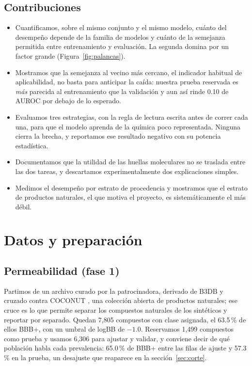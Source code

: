 \documentclass[twocolumn,10pt,letterpaper]{article}
\begin{document}
\subsection{Contribuciones}

\begin{itemize}\itemsep1pt
\item Cuantificamos, sobre el mismo conjunto y el mismo modelo, cuánto del desempeño depende de la familia de modelos y cuánto de la semejanza permitida entre entrenamiento y evaluación. La segunda domina por un factor grande (Figura~\ref{fig:palancas}).
\item Mostramos que la semejanza al vecino más cercano, el indicador habitual de aplicabilidad, no basta para anticipar la caída: nuestra prueba reservada es \emph{más} parecida al entrenamiento que la validación y aun así rinde 0.10 de AUROC por debajo de lo esperado.
\item Evaluamos tres estrategias, con la regla de lectura escrita antes de correr cada una, para que el modelo aprenda de la química poco representada. Ninguna cierra la brecha, y reportamos ese resultado negativo con su potencia estadística.
\item Documentamos que la utilidad de las huellas moleculares no se traslada entre las dos tareas, y descartamos experimentalmente dos explicaciones simples.
\item Medimos el desempeño por estrato de procedencia y mostramos que el estrato de productos naturales, el que motiva el proyecto, es sistemáticamente el más débil.
\end{itemize}

\section{Datos y preparación}

\subsection{Permeabilidad (fase 1)}

Partimos de un archivo curado por la patrocinadora, derivado de B3DB \autocite{meng2021b3db} y cruzado contra COCONUT \autocite{chandrasekhar2025coconut}, una colección abierta de productos naturales; ese cruce es lo que permite separar los compuestos naturales de los sintéticos y reportar por separado. Quedan 7,805 compuestos con clase asignada, el 63.5\,\% de ellos BBB+, con un umbral de logBB de $-1.0$. Reservamos 1,499 compuestos como prueba y usamos 6,306 para ajustar y validar, y conviene decir de qué población habla cada prevalencia: 65.0\,\% de BBB+ entre las filas de ajuste y 57.3\,\% en la prueba, un desajuste que reaparece en la sección~\ref{sec:corte}.
\end{document}
